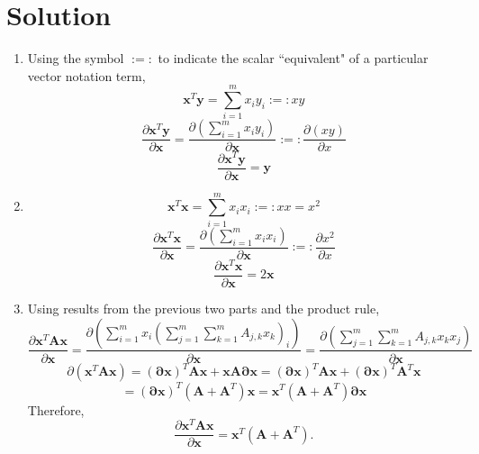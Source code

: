 \documentclass[submit]{harvardml}
\renewcommand{\v}[1]{\mathbf{#1}}
\begin{document}
\section*{Solution}

\begin{enumerate}[label=(\alph*)]
    \item Using the symbol $:=:$ to indicate the scalar ``equivalent" of a particular vector notation term,\[\v x^T \v y = \sum_{i=1}^{m} x_i y_i :=: x y\]\[\frac{\partial \v x^T \v y}{\partial \v x} = \frac{\partial(\sum_{i=1}^{m} x_i y_i)}{\partial \v x} :=: \frac{\partial(x y)}{\partial x}\]\[\frac{\partial \v x^T \v y}{\partial \v x} = \v y\]
    
    \item \[\v x^T \v x = \sum_{i=1}^{m} x_i x_i :=: x x = x^2\]\[\frac{\partial \v x^T \v x}{\partial \v x} = \frac{\partial(\sum_{i=1}^{m} x_i x_i)}{\partial \v x} :=: \frac{\partial x^2}{\partial x}\]\[\frac{\partial \v x^T \v x}{\partial \v x} = 2 \v x\]
    
    \item Using results from the previous two parts and the product rule,\[\frac{\partial \v x^T \v A \v x}{\partial \v x} = \frac{\partial(\sum_{i=1}^{m} x_i (\sum_{j=1}^{m} \sum_{k=1}^{m} A_{j,k} x_k)_i)}{\partial \v x} = \frac{\partial(\sum_{j=1}^{m} \sum_{k=1}^{m} A_{j,k} x_k x_j)}{\partial \v x}\]\[\partial(\v x^T \v A \v x)=(\v{\partial x})^T \v A \v x + \v x \v A \v{\partial x} = (\v{\partial x})^T \v A \v x + (\v{\partial x})^T \v A^T \v x\]\[=(\v{\partial x})^T (\v A + \v A^T) \v x = \v x^T (\v A + \v A^T) \v{\partial x}\] Therefore,\[\frac{\partial \v x^T \v A \v x}{\partial \v x} = \v x^T (\v A + \v A^T).\]
    
\end{enumerate}

\newpage
\end{document}
